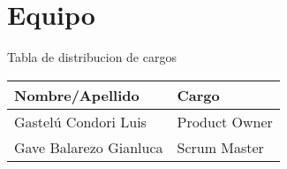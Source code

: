 \chapter{Equipo}
\begin{table}[htbp]
	Tabla de distribucion de cargos
	\begin{center}
		\begin{tabular}{|l|l|}
			\hline
			Nombre/Apellido & Cargo \\
			\hline \hline
			Gastelú Condori Luis &  Product Owner\\ \hline
			Gave Balarezo Gianluca & Scrum Master  \\ \hline
		\end{tabular}
	\end{center}
\end{table}